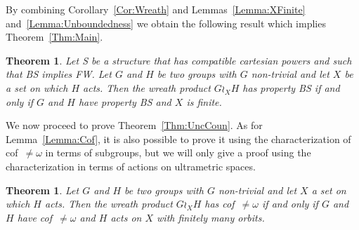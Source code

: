\documentclass[a4paper]{article}
\newtheorem{thm}[lem]{Theorem}
\theoremstyle{definition}
\begin{document}
%
%
By combining Corollary~\ref{Cor:Wreath} and Lemmas~\ref{Lemma:XFinite} and~\ref{Lemma:Unboundedness} we obtain the following result which implies Theorem~\ref{Thm:Main}.
%
%
\begin{thm}\label{Thm:Technic}
Let S be a structure that has compatible cartesian powers and such that BS implies FW.
Let $G$ and $H$ be two groups with $G$ non-trivial and let $X$ be a set on which $H$ acts. Then the wreath product $G \wr_X H$ has property BS if and only if $G$ and $H$ have property BS and $X$ is finite.
\end{thm}
%
%
We now proceed to prove Theorem~\ref{Thm:UncCoun}.
As for Lemma~\ref{Lemma:Cof}, it is also possible to prove it using the characterization of cof~$\neq\omega$ in terms of subgroups, but we will only give a proof using the characterization in terms of actions on ultrametric spaces.
%
%
\begin{thm}
Let $G$ and $H$ be two groups with $G$ non-trivial and let $X$ a set on which $H$ acts. Then the wreath product $G \wr_X H$ has cof~$\neq\omega$ if and only if $G$ and $H$ have cof~$\neq\omega$ and $H$ acts on $X$ with finitely many orbits.
\end{thm}
\end{document}
